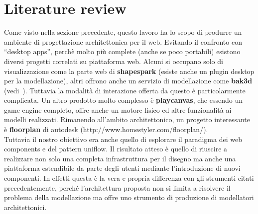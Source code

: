 \section{Literature review}\label{sec:literature}

Come visto nella sezione precedente, questo lavoro ha lo scopo di produrre un ambiente di progettazione architettonica per il web. Evitando il confronto con ``desktop apps'', perch\`e molto pi\`u complete (anche se poco portabili) esistono diversi progetti correlati su piattaforma web. Alcuni si occupano solo di visualizzazione come la parte web di \textbf{shapespark} (esiste anche un plugin desktop per la modellazione), altri offrono anche un servizio di modellazione come \textbf{bak3d} (vedi~\cite{Spini:2016:WIA:2945292.2945309}). Tuttavia la modalit\`a di interazione offerta da questo \`e particolarmente complicata. Un altro prodotto molto complesso \`e \textbf{playcanvas}, che essendo un game engine completo, offre anche un motore fisico ed altre funzionalit\`a ai modelli realizzati. Rimanendo all'ambito architettonico, un progetto interessante \`e \textbf{floorplan} di autodesk (http://www.homestyler.com/floorplan/).\\
Tuttavia il nostro obiettivo era anche quello di esplorare il paradigma dei web components e del pattern uniflow. Il risultato atteso \`e quello di riuscire a realizzare non solo una completa infrastruttura per il disegno ma anche una piattaforma estendibile da parte degli utenti mediante l'introduzione di nuovi componenti. In effetti questa \`e la vera e propria differenza con gli strumenti citati precedentemente, perché l'architettura proposta non si limita a risolvere il problema della modellazione ma offre uno strumento di produzione di modellatori architettonici.